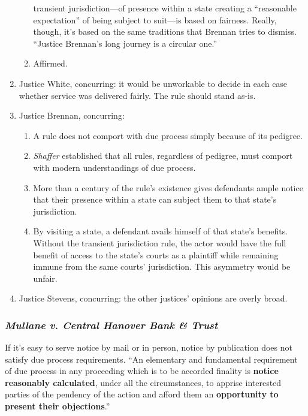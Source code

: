 \begin{enumerate}
\begin{enumerate}
        transient jurisdiction---of presence within a state creating a 
        ``reasonable expectation'' of being subject to suit---is based on 
        fairness. Really, though, it's based on the same traditions that 
        Brennan tries to dismiss. ``Justice Brennan's long journey is a 
        circular one.''
        \item Affirmed.
    \end{enumerate}
    \item Justice White, concurring: it would be unworkable to decide in each 
    case whether service was delivered fairly. The rule should stand as-is.
    \item Justice Brennan, concurring:
    \begin{enumerate}
        \item A rule does not comport with due process simply because of its 
        pedigree.
        \item \emph{Shaffer} established that all rules, regardless of 
        pedigree, must comport with modern understandings of due process.
        \item More than a century of the rule's existence gives defendants 
        ample notice that their presence within a state can subject them to 
        that state's jurisdiction.
        \item By visiting a state, a defendant avails himself of that state's 
        benefits. Without the transient jurisdiction rule, the actor would 
        have the full benefit of access to the state's courts as a plaintiff 
        while remaining immune from the same courts' jurisdiction. This 
        asymmetry would be unfair.
    \end{enumerate}
    \item Justice Stevens, concurring: the other justices' opinions are overly 
    broad.
\end{enumerate}

\subsubsection{\emph{Mullane v. Central Hanover Bank \& Trust}}

If it's easy to serve notice by mail or in person, notice by publication does 
not satisfy due process requirements.  ``An elementary and fundamental 
requirement of due process in any proceeding which is to be accorded finality 
is \textbf{notice reasonably calculated}, under all the circumstances, to 
apprise interested parties of the pendency of the action and afford them an 
\textbf{opportunity to present their objections}.''

